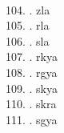 \begin{tabbing}
\egroup  \\
104.	. 	\> zla 	\> \bgroup\tibetan \def\u#1{\vtop{\baselineskip0pt\hbox{#1}\hbox{\tibsp\char123}}}\parindent=0pt \newbox\fillerbox\setbox\fillerbox\hbox{\vrule height0.4cm depth0.4cm width0pt}\def\filler{\copy\fillerbox}\filler\tibsp{}\tenrm\ \tibetan
\egroup  \\
105.	. 	\> rla 	\> \bgroup\tibetan \def\u#1{\vtop{\baselineskip0pt\hbox{#1}\hbox{\tibsp\char123}}}\parindent=0pt \newbox\fillerbox\setbox\fillerbox\hbox{\vrule height0.4cm depth0.4cm width0pt}\def\filler{\copy\fillerbox}\filler\tibsp{}\tenrm\ \tibetan
\egroup  \\
106.	. 	\> sla 	\> \bgroup\tibetan \def\u#1{\vtop{\baselineskip0pt\hbox{#1}\hbox{\tibsp\char123}}}\parindent=0pt \newbox\fillerbox\setbox\fillerbox\hbox{\vrule height0.4cm depth0.4cm width0pt}\def\filler{\copy\fillerbox}\filler\tibsp{}\tenrm\ \tibetan
\egroup  \\
107.	. 	\> rkya 	\> \bgroup\tibetan \def\u#1{\vtop{\baselineskip0pt\hbox{#1}\hbox{\tibsp\char123}}}\parindent=0pt \newbox\fillerbox\setbox\fillerbox\hbox{\vrule height0.4cm depth0.4cm width0pt}\def\filler{\copy\fillerbox}\filler\tibsp{}\tenrm\ \tibetan
\egroup  \\
108.	. 	\> rgya 	\> \bgroup\tibetan \def\u#1{\vtop{\baselineskip0pt\hbox{#1}\hbox{\tibsp\char123}}}\parindent=0pt \newbox\fillerbox\setbox\fillerbox\hbox{\vrule height0.4cm depth0.4cm width0pt}\def\filler{\copy\fillerbox}\filler\tibsp{}\tenrm\ \tibetan
\egroup  \\
109.	. 	\> skya 	\> \bgroup\tibetan \def\u#1{\vtop{\baselineskip0pt\hbox{#1}\hbox{\tibsp\char123}}}\parindent=0pt \newbox\fillerbox\setbox\fillerbox\hbox{\vrule height0.4cm depth0.4cm width0pt}\def\filler{\copy\fillerbox}\filler\tibsp{}\tenrm\ \tibetan
\egroup  \\
110.	.	\> skra		\> \bgroup\tibetan \def\u#1{\vtop{\baselineskip0pt\hbox{#1}\hbox{\tibsp\char123}}}\parindent=0pt \newbox\fillerbox\setbox\fillerbox\hbox{\vrule height0.4cm depth0.4cm width0pt}\def\filler{\copy\fillerbox}\filler\tibsp{}\tenrm\ \tibetan
\egroup  \\
111.	. 	\> sgya 	\> \bgroup\tibetan \def\u#1{\vtop{\baselineskip0pt\hbox{#1}\hbox{\tibsp\char123}}}\parindent=0pt \newbox\fillerbox\setbox\fillerbox\hbox{\vrule height0.4cm depth0.4cm width0pt}\def\filler{\copy\fillerbox}\filler\tibsp{}\tenrm\ \tibetan

\end{tabbing}
